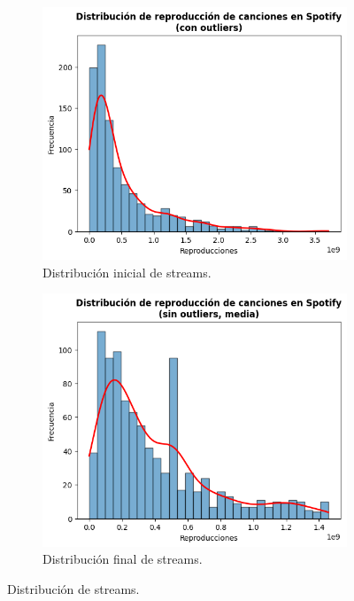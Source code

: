 \documentclass{article}
\begin{document}
	\begin{figure}[h!]
		\centering
		\begin{subfigure}[b]{0.45\linewidth}
			\centering
			\includegraphics[width=\linewidth]{./streams_before.png}
			\caption{Distribución inicial de streams.}
			\label{fig:pre-streams}
		\end{subfigure}
		\hfill
		\begin{subfigure}[b]{0.45\linewidth}
			\centering
			\includegraphics[width=\linewidth]{./streams_after.png}
			\caption{Distribución final de streams.}
			\label{fig:post-streams}
		\end{subfigure}
		\hfill
		
		\caption{Distribución de streams.}
		\label{fig:streams}
	\end{figure}
	
\end{document}
